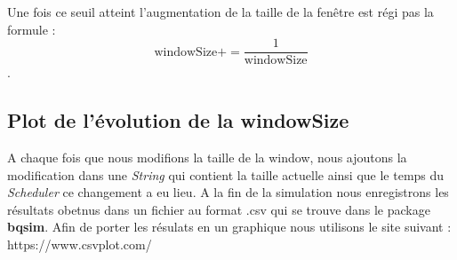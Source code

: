 \documentclass[../rapport.tex]{subfiles}
\begin{document}
\medskip

Une fois ce seuil atteint l'augmentation de la taille de la fenêtre est régi pas la formule :
\[ \text{windowSize} += \frac{1}{\text{windowSize}} \].


\subsection{Plot de l'évolution de la windowSize} A chaque fois que nous modifions la taille 
de la window, nous ajoutons la modification dans une \textit{String} qui contient la taille 
actuelle ainsi que le temps du \textit{Scheduler} ce changement a eu lieu. A la fin de la 
simulation nous enregistrons les résultats obetnus dans un fichier au format .csv qui se trouve
dans le package \textbf{bqsim}. Afin de porter les résulats en un graphique nous utilisons le site
suivant : https://www.csvplot.com/ 
\end{document}
